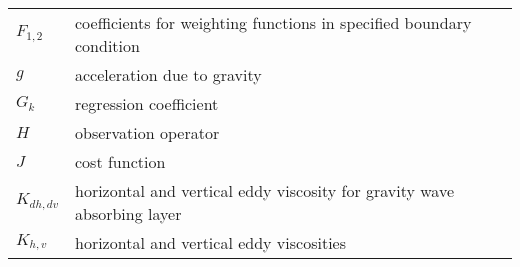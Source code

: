 \begin{tabular}{ l p{5.5in} }
$F_{1,2}$      & coefficients for weighting functions in specified boundary condition \\
$g$            & acceleration due to gravity \\
$G_k$          & regression coefficient \\
$H$            & observation operator \\
$J$            & cost function \\
$K_{dh,dv}$    & horizontal and vertical eddy viscosity for gravity wave absorbing layer \\
$K_{h,v}$      & horizontal and vertical eddy viscosities \\
\end{tabular}

\newpage
\vskip 5pt
\begin{tabular}{ l p{5.5in} }


\end{tabular}
